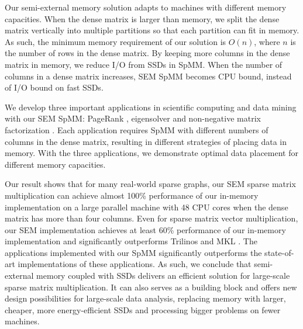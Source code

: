 Our semi-external memory solution adapts to machines with different memory
capacities. When the dense matrix is larger than memory, we split the dense
matrix vertically into multiple partitions so that each partition can fit in
memory. As such, the minimum memory requirement of our solution is $O(n)$,
where $n$ is the number of rows in the dense matrix. By keeping more columns
in the dense matrix in memory, we reduce I/O from SSDs in SpMM. When the number
of columns in a dense matrix increases, SEM SpMM becomes CPU bound, instead of
I/O bound on fast SSDs.

We develop three important applications in scientific computing and
data mining with our SEM SpMM: PageRank \cite{pagerank}, eigensolver
\cite{} and non-negative matrix factorization \cite{nmf}. Each application
requires SpMM with different numbers of columns in the dense matrix,
resulting in different strategies of placing data in memory.
With the three applications, we demonstrate optimal data placement for
different memory capacities.


Our result shows that for many real-world sparse graphs, our SEM sparse matrix
multiplication can achieve almost 100\% performance of our in-memory implementation
on a large parallel machine with 48 CPU cores
when the dense matrix has more than four columns. Even for sparse matrix vector
multiplication, our SEM implementation achieves at least 60\% performance of
our in-memory implementation and significantly outperforms Trilinos \cite{trilinos}
and MKL \cite{mkl}. The applications implemented with our SpMM significantly
outperforms the state-of-art implementations of these applications. As such,
we conclude that semi-external memory coupled with SSDs delivers an efficient
solution for large-scale sparse matrix multiplication. It can also serves
as a building block and offers new design possibilities for large-scale
data analysis, replacing memory with larger, cheaper, more energy-efficient SSDs
and processing bigger problems on fewer machines.
